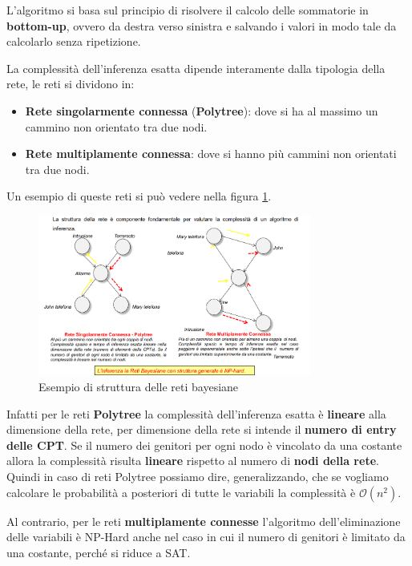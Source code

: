 L'algoritmo si basa sul principio di risolvere il calcolo delle sommatorie in
\textbf{bottom-up}, ovvero da destra verso sinistra e salvando i valori in modo
tale da calcolarlo senza ripetizione.

La complessità dell'inferenza esatta dipende interamente dalla tipologia della rete,
le reti si dividono in:
\begin{itemize}
    \item \textbf{Rete singolarmente connessa} (\textbf{Polytree}): dove si ha
          al massimo un cammino non orientato tra due nodi.
    \item \textbf{Rete multiplamente connessa}: dove si hanno più cammini non
          orientati tra due nodi.
\end{itemize}

Un esempio di queste reti si può vedere nella figura \ref{fig:struttura_reti}.

\begin{figure}[!ht]
    \centering
    \includegraphics[width=0.8\textwidth]{img/Reti/struttura_reti_bayesiane.png}
    \caption{Esempio di struttura delle reti bayesiane}
    \label{fig:struttura_reti}
\end{figure}

Infatti per le reti \textbf{Polytree} la complessità dell'inferenza esatta è \textbf{lineare}
alla dimensione della rete, per dimensione della rete si intende il \textbf{numero di entry
    delle CPT}. Se il numero dei genitori per ogni nodo è vincolato da una costante allora
la complessità risulta \textbf{lineare} rispetto al numero di \textbf{nodi della rete}.
Quindi in caso di reti Polytree possiamo dire, generalizzando, che se vogliamo calcolare
le probabilità a posteriori di tutte le variabili la complessità è $\mathcal{O}(n^2)$.

Al contrario, per le reti \textbf{multiplamente connesse} l'algoritmo dell'eliminazione
delle variabili è NP-Hard anche nel caso in cui il numero di genitori è limitato
da una costante, perché si riduce a SAT.

